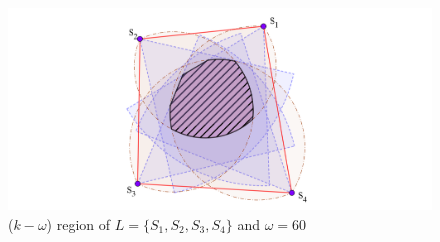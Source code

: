 \begin{figure}[h]
\begin{minipage}{.5\linewidth}
	\centering
	\includegraphics[scale=0.9]{hinhminhhoa.png}
\end{minipage}
\caption{($k-\omega$) region of $L=\{S_1,S_2,S_3,S_4\}$ and $\omega = 60$}
\end{figure}
